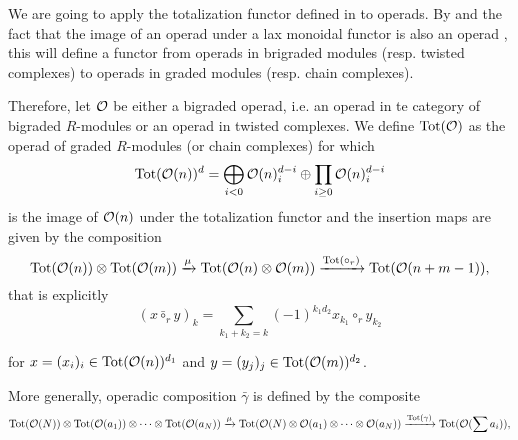 \documentclass[join.tex]{subfiles}
\begin{document}

We are going to apply the totalization  functor defined in  to operads. By  and the fact that the image of an operad under a lax monoidal functor is also an operad \cite[Proposition 3.1.1(a)]{fresse}, this will define a functor from operads in brigraded modules (resp. twisted complexes) to operads in graded modules (resp. chain complexes). %

Therefore, let ${\mathcal O}$ be either a bigraded operad, i.e. an operad in te category of bigraded $R$-modules or an operad in twisted complexes. We define $\mathrm{Tot}({\mathcal O})$ as the operad of graded $R$-modules (or chain complexes) for which \[\mathrm{Tot}({\mathcal O}(n))^d=\bigoplus_{i<0}{\mathcal O}(n)^{d-i}_i\oplus\prod_{i\geq 0} {\mathcal O}(n)^{d-i}_i\] is the image of ${\mathcal O}(n)$ under the totalization functor and the insertion maps are given by the composition  %
\begin{equation}\label{insertion}
\mathrm{Tot}({\mathcal O}(n))\otimes \mathrm{Tot}({\mathcal O}(m))\xrightarrow{\mu} \mathrm{Tot}({\mathcal O}(n)\otimes {\mathcal O}(m)) \xrightarrow{\mathrm{Tot}(\circ_r)} \mathrm{Tot}({\mathcal O}(n+m-1)),
\end{equation}
that is explicitly 
\[(x\bar{\circ}_ry)_k=\sum_{k_1+k_2=k} (-1)^{k_1d_2} x_{k_1}\circ_r y_{k_2}\]

for $x=(x_i)_i\in \mathrm{Tot}({\mathcal O}(n))^{d_1}$ and $y=(y_j)_j\in \mathrm{Tot}({\mathcal O}(m))^{d_2}$.

More generally, operadic composition $\bar{\gamma}$ is defined by the composite
\begin{equation*}
\mathrm{Tot}({\mathcal O}(N))\otimes \mathrm{Tot}({\mathcal O}(a_1))\otimes\cdots\otimes \mathrm{Tot}({\mathcal O}(a_N))\xrightarrow{\mu} \mathrm{Tot}({\mathcal O}(N)\otimes {\mathcal O}(a_1)\otimes\cdots\otimes {\mathcal O}(a_N)) \xrightarrow{\mathrm{Tot}(\gamma)} \mathrm{Tot}({\mathcal O}(\sum a_i)),
\end{equation*}
\end{document}
